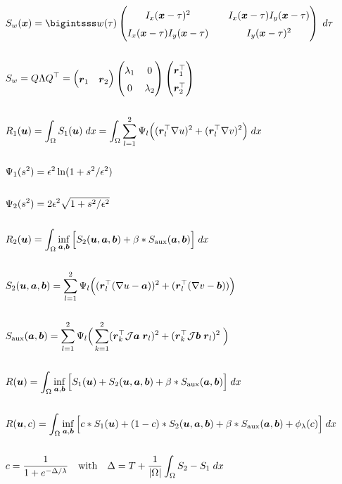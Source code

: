 \documentclass[11pt]{article}
\newcommand{\lam}{\lambda}
\newcommand{\mat}[1]{\begin{pmatrix} #1 \end{pmatrix}}
\newcommand{\Mat}[1]{\begingroup
\renewcommand*{\arraystretch}{1.5}
\mat{#1}
\endgroup}
\newcommand{\flow}{\boldsymbol{u}}
\newcommand{\x}{\boldsymbol{x}}
\newcommand{\ev}{\boldsymbol{r}}
\newcommand{\aaux}{\boldsymbol{a}}
\newcommand{\baux}{\boldsymbol{b}}
\newcommand{\T}{^\top}
\begin{document}
\begin{align*}
&S_w(\x) = \bigintsss w(\tau)\Mat{I_x(\x-\tau)^2 && I_x(\x-\tau)I_y(\x-\tau)\\I_x(\x-\tau)I_y(\x-\tau) && I_y(\x-\tau)^2} \;d\tau
\\\\
&S_w = Q \Lambda Q\T = \mat{\ev_1&\ev_2}\mat{\lam_1&0\\0&\lam_2}\mat{\ev_1\T\\ \ev_2\T}
\\\\
&R_1(\flow)=\int_\Omega S_1(\flow)\;dx = \int_\Omega \sum_{l=1}^2 \Psi_l\Big((\ev_l\T\nabla u)^2+(\ev_l\T\nabla v)^2\Big)\;dx
\\\\
&\Psi_1(s^2) = \epsilon^2\ln(1+s^2/\epsilon^2)
\\\\
&\Psi_2(s^2) = 2\epsilon^2\sqrt{1+s^2/\epsilon^2}
\\\\
&R_2(\flow) = \int_\Omega \inf_{\aaux,\baux}\Big[ S_2(\flow,\aaux,\baux) + \beta * S_{\text{aux}}(\aaux,\baux) \Big]\;dx
\\\\
&S_2(\flow,\aaux,\baux) = \sum_{l=1}^2 \Psi_l\Big( (\ev_l\T(\nabla u-\aaux))^2 + (\ev_l\T(\nabla v-\baux)) \Big)
\\\\
&S_{\text{aux}}(\aaux,\baux) = \sum_{l=1}^2 \Psi_l\Big( \sum_{k=1}^2 (\ev_k\T \mathcal{J}\aaux\;\ev_l)^2 + (\ev_k\T \mathcal{J}\baux\;\ev_l)^2\;\Big)
\\\\
&R(\flow) = \int_\Omega \inf_{\aaux,\baux}\Big[ S_1(\flow) +  S_2(\flow,\aaux,\baux) + \beta * S_{\text{aux}}(\aaux,\baux) \Big]\;dx
\\\\
&R(\flow, c) = \int_\Omega \inf_{\aaux,\baux}\Big[ c*S_1(\flow) +  (1-c)*S_2(\flow,\aaux,\baux) + \beta * S_{\text{aux}}(\aaux,\baux) + \phi_\lambda(c)\Big]\;dx
\\\\
&c = \frac{1}{1+e^{-\Delta/\lambda}} \quad\text{with}\quad\Delta=T+\frac{1}{|\Omega|}\int_\Omega S_2 - S_1 \; dx
\end{align*}
\end{document}
